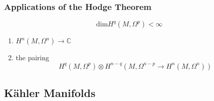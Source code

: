 \subsubsection{Applications of the Hodge Theorem}

\begin{thm}

\[
	\mathrm{dim} H^q (M, \Omega^p) < \infty
\]


\end{thm}

\begin{thm}

\begin{enumerate}
	\item $ H^n \left( M, \Omega^n \right) \xrightarrow{~} \mathbb{C}$
	\item the pairing
		\[
			H^q \left( M, \Omega^p \right) \otimes H^{ n-q } \left( M, \Omega^{ n-p } \to H^n \left( M, \Omega^n \right) \right)
		\]
		
\end{enumerate}

\end{thm}

\subsection{K\"ahler Manifolds}























